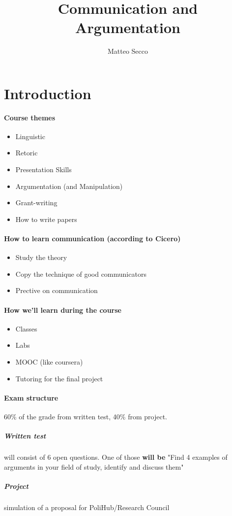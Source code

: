 \documentclass{article}
\author{Matteo Secco}
\title{Communication and Argumentation}
\begin{document}
\maketitle\newpage
\tableofcontents\newpage

\section{Introduction}
\paragraph{Course themes}
\begin{itemize}
\item Linguistic
\item Retoric
\item Presentation Skills
\item Argumentation (and Manipulation)
\item Grant-writing
\item How to write papers
\end{itemize}

\paragraph{How to learn communication (according to Cicero)}
\begin{itemize}
\item Study the theory
\item Copy the technique of good communicators
\item Prective on communication
\end{itemize}

\paragraph{How we'll learn during the course}
\begin{itemize}
\item Classes
\item Labs
\item MOOC (like coursera)
\item Tutoring for the final project
\end{itemize}

\paragraph{Exam structure}
60\% of the grade from written test, 40\% from project.
\subparagraph{Written test} will consist of 6 open questions. One of those \textbf{will be} "Find 4 examples of arguments in your field of study, identify and discuss them"
\subparagraph{Project} simulation of a proposal for PoliHub/Research Council
\end{document}
